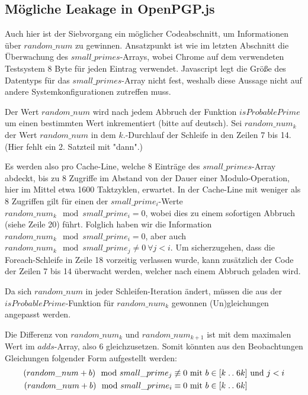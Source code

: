 \subsection{Mögliche Leakage in OpenPGP.js}
\label{LeakageOpenPGPjs}

Auch hier ist der Siebvorgang ein möglicher Codeabschnitt, um Informationen über $random\_num$ zu gewinnen.
Ansatzpunkt ist wie im letzten Abschnitt die Überwachung des $small\_primes$-Arrays, wobei Chrome auf dem verwendeten Testsystem 8 Byte für jeden Eintrag verwendet. Javascript legt die Größe des Datentyps für das $small\_primes$-Array nicht fest, weshalb diese Aussage nicht auf andere Systemkonfigurationen zutreffen muss.

Der Wert $random\_num$ wird nach jedem Abbruch der Funktion $isProbablePrime$ um einen bestimmten Wert inkrementiert (bitte auf deutsch).
Sei $random\_num_k$ der Wert $random\_num$ in dem $k.$-Durchlauf der Schleife in den Zeilen 7 bis 14. (Hier fehlt ein 2. Satzteil mit "dann".)

Es werden also pro Cache-Line, welche 8 Einträge des $small\_primes$-Array abdeckt, bis zu 8 Zugriffe im Abstand von der Dauer einer Modulo-Operation, hier im Mittel etwa 1600 Taktzyklen, erwartet.
In der Cache-Line mit weniger als 8 Zugriffen gilt für einen der $small\_prime_i$-Werte $random\_num_k \mod small\_prime_i = 0$, wobei dies zu einem sofortigen Abbruch (siehe Zeile 20) führt.
Folglich haben wir die Information $random\_num_k \mod small\_prime_i = 0$, aber auch $random\_num_k \mod small\_prime_j \neq 0 \: \forall j < i$.
Um sicherzugehen, dass die Foreach-Schleife in Zeile 18 vorzeitig verlassen wurde, kann zusätzlich der Code der Zeilen 7 bis 14 überwacht werden, welcher nach einem Abbruch geladen wird.

Da sich $random\_num$ in jeder Schleifen-Iteration ändert, müssen die aus der $isProbablePrime$-Funktion für $random\_num_k$ gewonnen (Un)gleichungen  angepasst werden.

Die Differenz von $random\_num_k$ und $random\_num_{k+1}$ ist mit dem maximalen Wert im $adds$-Array, also 6 gleichzusetzen.
Somit könnten aus den Beobachtungen Gleichungen folgender Form aufgestellt werden:
\begin{align*}
    (random\_num + b) \mod small\_prime_j \not\equiv 0 &\text{ mit } b \in [k\mathrel{{.}\,{.}}\nobreak6k] \text{ und } j < i\\
    (random\_num + b) \mod small\_prime_i \equiv 0 &\text{ mit } b \in [k\mathrel{{.}\,{.}}\nobreak6k]
\end{align*}

